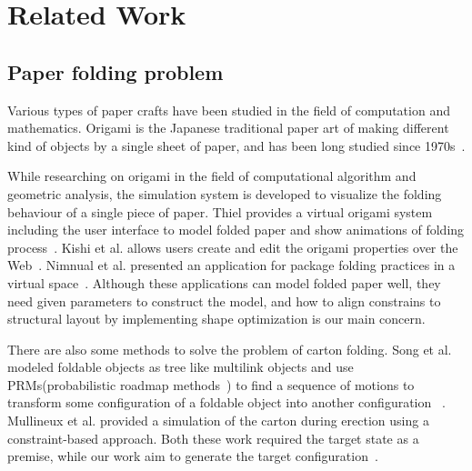 \documentclass[submission]{gmp2018}
\begin{document}
\section{Related Work}\label{sec:relatedwork}
\subsection{Paper folding problem}
Various types of paper crafts have been studied in the field of computation and mathematics. Origami is the Japanese traditional paper art of making different kind of objects by a single sheet of paper, and has been long studied since 1970s~\cite{KANADE1980279}.

While researching on origami in the field of computational algorithm and geometric analysis, the simulation system is developed to visualize the folding behaviour of a single piece of paper. Thiel provides a virtual origami system including the user interface to model folded paper and show animations of folding process~\cite{Thiel1998}. Kishi et al. allows users create and edit the origami properties over the Web~\cite{Kishi:1998:OFP:786112.786279}. Nimnual et al. presented an application for package folding practices in a virtual space~\cite{Nimnual2007Virtual}. Although these applications can model folded paper well, they need given parameters to construct the model, and how to align constrains to structural layout by implementing shape optimization is our main concern.

There are also some methods to solve the problem of carton folding. Song et al. modeled foldable objects as tree like multilink objects and use PRMs(probabilistic roadmap methods~\cite{Kavraki:1994:PRP:891758}) to find a sequence of motions to transform some configuration of a foldable object into another configuration~ \cite{Song:2000:MPA:892954}. Mullineux et al. provided a simulation of the carton during erection using a constraint-based approach. Both these work required the target state as a premise, while our work aim to generate the target configuration~\cite{Mullineux:2010:CSC:1739328.1739673}.
\end{document}
